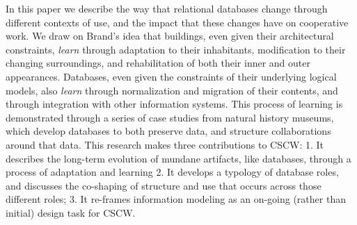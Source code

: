 In this paper we describe the way that relational databases change through different contexts of use, and the impact that these changes have on cooperative work. We draw on Brand's idea that buildings, even given their architectural constraints, \emph{learn} through adaptation to their inhabitants, modification to their changing surroundings, and rehabilitation of both their inner and outer appearances. Databases, even given the constraints of their underlying logical models, also \emph{learn} through normalization and migration of their contents, and through integration with other information systems. This process of learning is demonstrated through a series of case studies from natural history museums, which develop databases to both preserve data, and structure collaborations around that data. This research makes three contributions to CSCW: 1. It describes the long-term evolution of mundane artifacts, like databases, through a process of adaptation and learning 2. It develops a typology of database roles, and discusses the co-shaping of structure and use that occurs across those different roles; 3. It re-frames information modeling as an on-going (rather than initial) design task for CSCW.